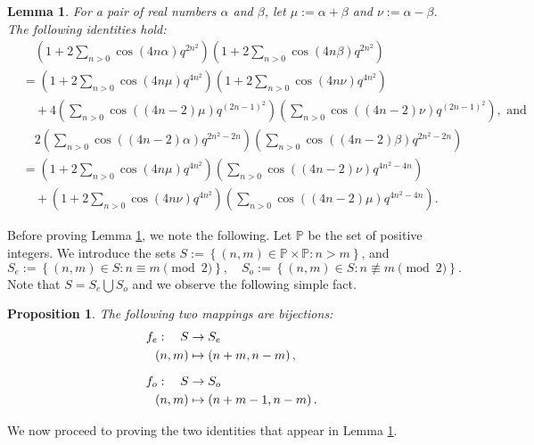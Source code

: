 \documentclass[11pt,reqno]{amsart}
\numberwithin{equation}{section}
\theoremstyle{plain}
\newtheorem{lemma}[theorem]{Lemma}
\newtheorem{proposition}[theorem]{Proposition}
\theoremstyle{definition}
\theoremstyle{named}
\newcommand{\set}[1]{\left\{#1\right\}}
\def\bP{\mathbb{P}}
\begin{document}
\begin{lemma}\label{lem:new 2-dis}
For a pair of real numbers $\alpha$ and $\beta$, let $\mu:=\alpha+\beta$ and $\nu:=\alpha-\beta$. The following identities hold:
\begin{align}
&\quad \left(1+2\sum_{n>0}\cos(4n\alpha)q^{2n^2}\right)\left(1+2\sum_{n>0}\cos(4n\beta)q^{2n^2}\right)\nonumber\\
&=\left(1+2\sum_{n>0}\cos(4n\mu)q^{4n^2}\right)\left(1+2\sum_{n>0}\cos(4n\nu)q^{4n^2}\right)\nonumber\\
&\quad +4\left(\sum_{n>0}\cos((4n-2)\mu)q^{(2n-1)^2}\right)\left(\sum_{n>0}\cos((4n-2)\nu)q^{(2n-1)^2}\right)\label{id:new 2-dis-e},  \textrm{\ \ and} \\
&\quad 2\left(\sum_{n>0}\cos((4n-2)\alpha)q^{2n^2-2n}\right)\left(\sum_{n>0}\cos((4n-2)\beta)q^{2n^2-2n}\right)\nonumber\\
&=\left(1+2\sum_{n>0}\cos(4n\mu)q^{4n^2}\right)\left(\sum_{n>0}\cos((4n-2)\nu)q^{4n^2-4n}\right) \nonumber\\
&\quad +\left(1+2\sum_{n>0}\cos(4n\nu)q^{4n^2}\right)\left(\sum_{n>0}\cos((4n-2)\mu)q^{4n^2-4n}\right).
\label{id:new 2-dis-o}
\end{align}
\end{lemma}

Before proving Lemma \ref{lem:new 2-dis}, we note the following.
Let $\bP$ be the set of positive integers. We introduce the sets $S:=\set{(n,m)\in\bP\times\bP: n>m}$, and 
$$S_e:=\set{(n,m)\in S: n\equiv m\pmod 2},\quad S_o:=\set{(n,m)\in S: n\not\equiv m\pmod 2}.$$
Note that $S=S_e\bigcup S_o$ and we observe the following simple fact.
\begin{proposition}\label{prop:two bij}
The following two mappings are bijections:
\begin{align*}
f_e:\quad S &\to S_e \\
(n,m) &\mapsto \left(n+m,n-m\right),\\
\noalign{\medskip}
f_o:\quad S &\to S_o \\
(n,m) &\mapsto \left(n+m-1,n-m\right).
\end{align*}
\end{proposition}
We now proceed to proving the two identities that appear in Lemma \ref{lem:new 2-dis}.
\end{document}
